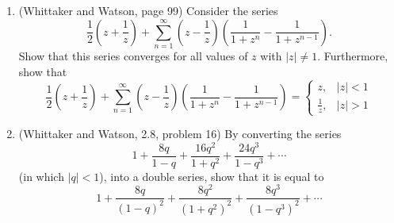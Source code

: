 \documentclass[a4paper,10pt]{article}
\begin{document}
\begin{enumerate}
\item (Whittaker and Watson, page 99)
Consider the series 
 $$ \frac{1}{2} \left( z + \frac{1}{z} \right) + \sum_{n=1}^\infty \left( z - \frac{1}{z} \right) \left( \frac{1}{1+z^n} - \frac{1}{1+z^{n-1}} \right). $$
Show that this series converges for all values of $z$ with $\vert z \vert \neq 1$. 
Furthermore, show that 
$$ \frac{1}{2} \left( z + \frac{1}{z} \right) + \sum_{n=1}^\infty \left( z - \frac{1}{z} \right) \left( \frac{1}{1+z^n} - \frac{1}{1+z^{n-1}} \right) = \begin{cases}
z, & \vert z \vert <1 \\
\frac{1}{z}, & \vert z \vert > 1
\end{cases}$$

\item (Whittaker and Watson, 2.8, problem 16)
By converting the series 
 $$1 + \frac{8q}{1-q} + \frac{16q^2}{1+q^2} + \frac{24q^3}{1-q^3} + \cdots $$ 
(in which $\vert q \vert<1$), into a double series, show that it is equal to 
 $$ 1 + \frac{8q}{(1-q)^2}+ \frac{8q^2}{(1+q^2)^2} + \frac{8q^3}{(1-q^3)^2} + \cdots $$
\end{enumerate}
\end{document}
